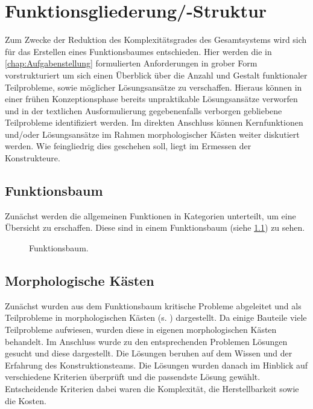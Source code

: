 \chapter{Funktionsgliederung/-Struktur}
	Zum Zwecke der Reduktion des Komplexitätsgrades des Gesamtsystems wird sich für das Erstellen eines Funktionsbaumes entschieden.
	Hier werden die in \cref{chap:Aufgabenstellung} formulierten Anforderungen in grober Form vorstrukturiert um sich einen Überblick über die Anzahl und Gestalt funktionaler Teilprobleme, sowie möglicher Lösungsansätze zu verschaffen.
	Hieraus können in einer frühen Konzeptionsphase bereits unpraktikable Lösungsansätze verworfen und in der textlichen Ausformulierung gegebenenfalls verborgen gebliebene Teilprobleme identifiziert werden.
	Im direkten Anschluss können Kernfunktionen und/oder Lösungsansätze im Rahmen morphologischer Kästen weiter diskutiert werden.	Wie feingliedrig dies geschehen soll, liegt im Ermessen der Konstrukteure.

\section{Funktionsbaum}
	Zunächst werden die allgemeinen Funktionen in Kategorien unterteilt, um eine Übersicht zu erschaffen. Diese sind in einem Funktionsbaum (siehe \cref{fig:funktionsbaum}) zu sehen.
	\begin{figure}[h]
		\centering
		
		\caption[Funktionsbaum]{Funktionsbaum.}
		\label{fig:funktionsbaum}
	\end{figure}

\section{Morphologische Kästen}
	Zunächst wurden aus dem Funktionsbaum kritische Probleme abgeleitet und als Teilprobleme in morphologischen Kästen (s. ) dargestellt. Da einige Bauteile viele Teilprobleme aufwiesen, wurden diese in eigenen morphologischen Kästen behandelt. Im Anschluss wurde zu den entsprechenden Problemen Lösungen gesucht und diese dargestellt. Die Lösungen beruhen auf dem Wissen und der Erfahrung des Konstruktionsteams. Die Lösungen wurden danach im Hinblick auf verschiedene Kriterien überprüft und die passendste Lösung gewählt. Entscheidende Kriterien dabei waren die Komplexität, die Herstellbarkeit sowie die Kosten.

